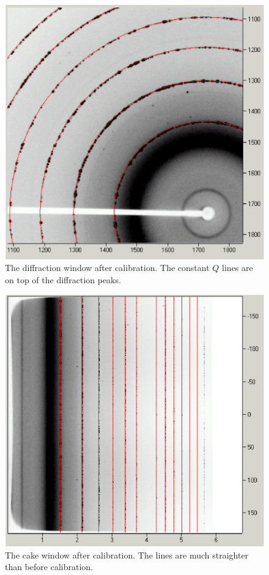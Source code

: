 \begin{figure}
    \centering
    \includegraphics[scale=.75]
    {figures/good_calibration_diffraction_image.eps}
    \caption{The diffraction window after calibration. The
    constant $Q$ lines are on top of the diffraction 
    peaks.}
    \label{good_calibration_diffraction_image}
\end{figure}

\begin{figure}
    \centering
    \includegraphics[scale=.75]
    {figures/good_calibration_cake.eps}
    \caption{The cake window after calibration.  The lines 
    are much straighter than before calibration.}
    \label{good_calibration_cake}
\end{figure}

